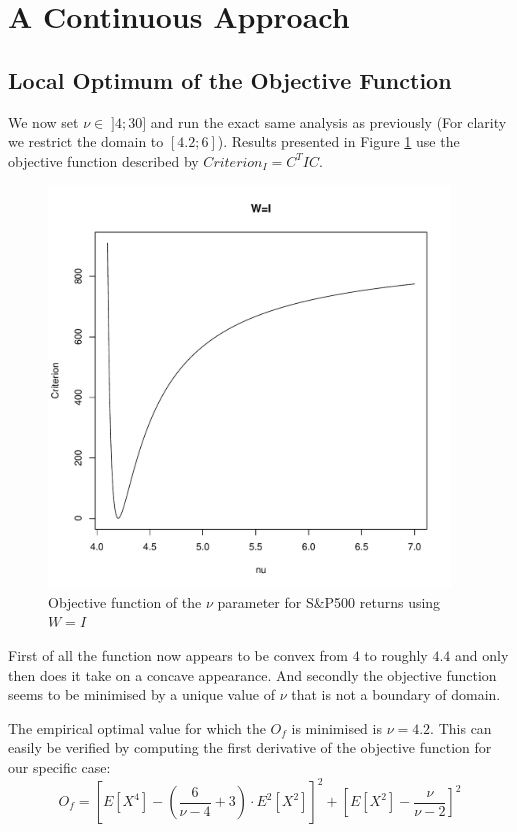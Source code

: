 \section{A Continuous Approach}

\subsection{Local Optimum of the Objective Function}

We now set $\nu \in \; ]4;30]$ and run the exact same analysis as previously (For clarity we restrict the domain to $[4.2;6]$). Results presented in Figure \ref{ConcavitySPI} use the objective function described by $Criterion_I = C^T I C$.
\begin{figure}
    \centering
    \includegraphics[width=0.95\textwidth]{ConcavityS&PI.pdf}
    \caption{Objective function of the $\nu$ parameter for S\&P500 returns using $W=I$}
    \label{ConcavitySPI}
\end{figure}
\par
First of all the function now appears to be convex from $4$ to roughly $4.4$ and only then does it take on a concave appearance. And secondly the objective function seems to be minimised by a unique value of $\nu$ that is not a boundary of domain.
\par
The empirical optimal value for which the $O_f$ is minimised is $\nu=4.2$. 
This can easily be verified by computing the first derivative of the objective function for our specific case:
\begin{equation}\label{ObjectiveFunction_I}
    O_f = \left[E\left[X^4\right] - \left(\frac{6}{\nu-4}+3\right)\cdot         
                E^2\left[X^2\right]\right]^2 +
            \left[E\left[X^2\right] - \frac{\nu}{\nu - 2}\right]^2
\end{equation}

